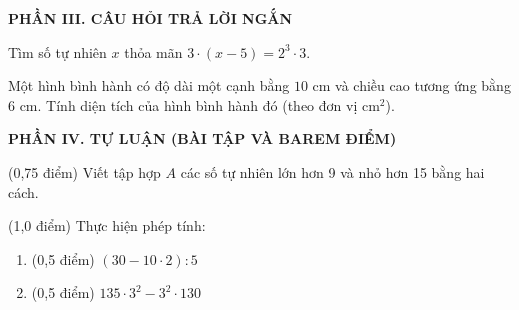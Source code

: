 \documentclass[12pt,a4paper]{article}
\begin{document}
\setcounter{ex}{0}
\vspace{2mm}
\noindent\textbf{\large PHẦN III. CÂU HỎI TRẢ LỜI NGẮN}
\vspace{1mm}
\begin{ex}
Tìm số tự nhiên $x$ thỏa mãn $3 \cdot (x - 5) = 2^3 \cdot 3$. 
\end{ex}

\begin{ex}
Một hình bình hành có độ dài một cạnh bằng $10\text{ cm}$ và chiều cao tương ứng bằng $6\text{ cm}$. Tính diện tích của hình bình hành đó (theo đơn vị $\text{cm}^2$). 
\end{ex}


\setcounter{ex}{0}
\vspace{2mm}
\noindent\textbf{\large PHẦN IV. TỰ LUẬN (BÀI TẬP VÀ BAREM ĐIỂM)}
\vspace{1mm}
\begin{ex} (0,75 điểm)
Viết tập hợp $A$ các số tự nhiên lớn hơn 9 và nhỏ hơn 15 bằng hai cách.
\end{ex}
\vspace{2mm}

\begin{ex} (1,0 điểm)
Thực hiện phép tính:
\begin{enumerate}[label=\textbf{\alph*)}, leftmargin=0.8cm, itemsep=2pt]
\item (0,5 điểm) $(30 - 10 \cdot 2) : 5$
\item (0,5 điểm) $135 \cdot 3^2 - 3^2 \cdot 130$
\end{enumerate}
\end{ex}
\vspace{2mm}
\end{document}
